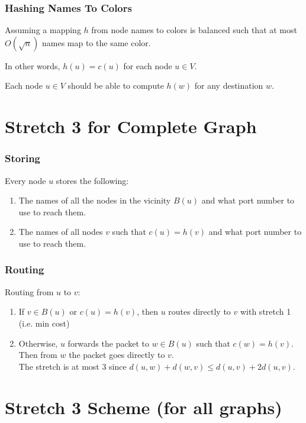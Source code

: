 \documentclass[10pt, compress]{beamer}
\begin{document}
\begin{frame}[fragile]
  \frametitle{Hashing Names To Colors}

  Assuming a mapping $h$ from node names to colors is balanced such that at most $O(\sqrt{n})$ names map to the same color.

  In other words, $h(u)=c(u)$ for each node $u\in V$.

  Each node $u\in V$ should be able to compute $h(w)$ for any destination $w$.


\end{frame}

\section{Stretch 3 for Complete Graph}

\begin{frame}[fragile]
  \frametitle{Storing}

  Every node $u$ stores the following:

  \begin{enumerate}
    \item The names of all the nodes in the vicinity $B(u)$ and what port number to use to reach them.
    \item The names of all nodes $v$ such that $c(u)=h(v)$ and what port number to use to reach them.
  \end{enumerate}


\end{frame}


\begin{frame}[fragile]
  \frametitle{Routing}

  Routing from $u$ to $v$:
  \begin{enumerate}
    \item If $v\in B(u)$ or $c(u)=h(v)$, then $u$ routes directly to $v$ with stretch 1 (i.e. min cost)
    \item Otherwise, $u$ forwards the packet to $w\in B(u)$ such that $c(w)=h(v)$. Then from $w$ the packet goes directly to $v$.\\
        The stretch is at most $3$ since $d(u,w) + d(w,v) \leq d(u,v)+2d(u,v)$.
  \end{enumerate}


\end{frame}


\section{Stretch 3 Scheme (for all graphs)}
\end{document}

